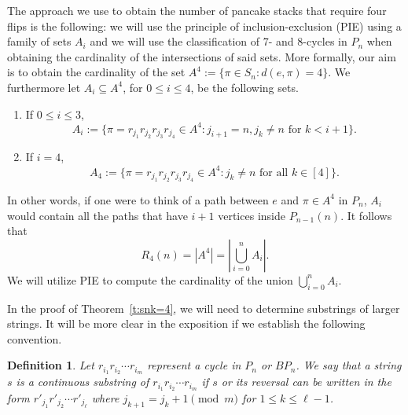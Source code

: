 \documentclass[final]{dmtcs-episciences}
\numberwithin{equation}{section}
\newtheorem{defn}[thm]{Definition}
\begin{document}
The approach we use to obtain the number of pancake stacks that require four flips is the following: we will use the principle of inclusion-exclusion (PIE) using a family of sets $A_i$ and we will use the classification of 7- and 8-cycles in $P_n$ when obtaining the cardinality of the intersections of said sets. More formally, our aim is to obtain the cardinality of the set $A^4:=\{\pi\in S_n: d(e,\pi)=4\}.$ We furthermore let $A_i\subseteq A^4$, for $0\leq i\leq 4$, be the following sets.

\begin{enumerate}
    \item If $0\leq i\leq 3$,  \begin{displaymath}A_i := \{\pi=r_{j_1}r_{j_2}r_{j_3}r_{j_4} \in A^4: j_{i+1}=n,j_k\neq n\text{ for }k<i+1\}.\end{displaymath}
    \item If $i=4$, \begin{displaymath}A_4 := \{\pi=r_{j_1}r_{j_2}r_{j_3}r_{j_4} \in A^4:  j_k\neq n \text{ for all }k\in[4]\}.\end{displaymath}
\end{enumerate}

In other words, if one were to think of a path between $e$ and $\pi\in A^4$ in $P_n$, $A_i$ would contain all the paths that have $i+1$ vertices inside $P_{n-1}(n)$. It follows that 
\begin{equation}\label{eq:PIE}
R_4(n)=|A^4|=\left|\bigcup_{i=0}^n A_i\right|.
\end{equation}
We will utilize PIE to compute the cardinality of the union $\bigcup_{i=0}^n A_i$. 

In the proof of Theorem~\ref{t:snk=4}, we will need to determine substrings of larger strings. It will be more clear in the exposition if we establish the following convention.


\begin{defn}
Let $r_{i_1}r_{i_2}\cdots r_{i_m}$ represent a cycle in $P_n$ or $BP_n$. We say that a string $s$ is a \emph{continuous substring} of $r_{i_1}r_{i_2}\cdots r_{i_m}$ if $s$ or its reversal can be written in the form $r'_{j_1}r'_{j_2}\cdots r'_{j_{\ell}}$ where $j_{k+1}=j_k+1\pmod m$ for $1\leq k\leq \ell-1$.
\end{defn}
\end{document}
